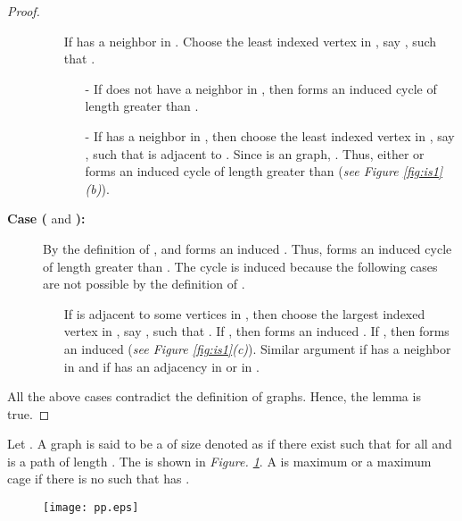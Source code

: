 \documentclass[runningheads]{llncs}
\begin{document}
\begin{proof}
\begin{description}
\begin{itemize}
\item[] If  has a neighbor in . Choose the least indexed vertex in , say , such that . 

\begin{itemize}
\item[-] If  does not have a neighbor in , then   forms an induced cycle of length greater than .
\item[-] If  has a neighbor in , then choose the least indexed vertex in , say , such that  is adjacent to . Since  is an  graph, . Thus, either  or  forms an induced cycle of length greater than  (\emph{see Figure  \ref{fig:is1}(b)}).
\end{itemize}

\end{itemize}


\item[\textbf{Case (} and \textbf{):}]
By the definition of ,  and  forms an induced . Thus,  forms an induced cycle of length greater than . The cycle is induced because the following cases are not possible by the definition of .


\begin{itemize}
\item[] If  is adjacent to some vertices in , then choose the largest indexed vertex in , say , such that  . If , then  forms an induced . If , then  forms an induced  (\emph{see Figure  \ref{fig:is1}(c)}). Similar argument if  has a neighbor in  and if  has an adjacency in  or in .
\end{itemize}
\end{description}
All the above cases contradict the definition of  graphs. Hence, the lemma is true. 
\end{proof}


\begin{definition}
Let . A graph  is said to be a   of size  denoted as  if there exist  such that  for all  and  is a path of length . The  is shown in \emph{Figure. \ref{fig:pp}}. A  is maximum or a maximum cage if there is no  such that  has .
\end{definition}



\begin{figure}[h]
\centering
\texttt{[image: pp.eps]}
\caption{}
\label{fig:pp}
\end{figure}
\end{document}

